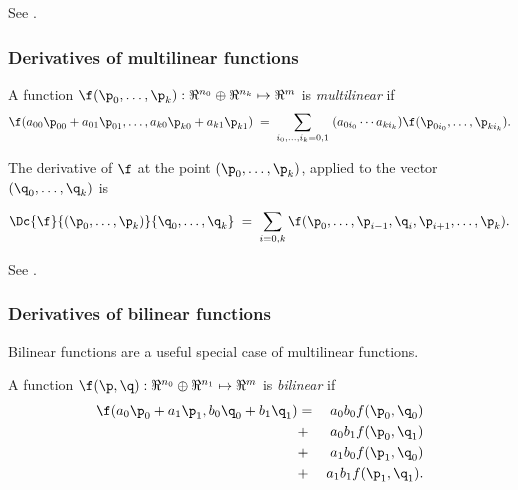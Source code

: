 See \cite[Theorem~2-2]{Spivak:1965:CalculusOnManifolds}.



\subsubsection{Derivatives of multilinear functions}
\label{sec:multilinear}

A function $\f(\p_0,\ldots,\p_k):\Re^{n_0} \oplus \Re^{n_k} \mapsto \Re^m$
is {\it multilinear} if
\begin{equation}
\f(a_{00} \p_{00} + a_{01} \p_{01}, \ldots, a_{k0} \p_{k0} + a_{k1} \p_{k1})
\; = \; \sum_{i_0,\ldots,i_k = 0,1} \;(a_{0i_0} \cdots a_{ki_k}) \f(\p_{0i_0}, \ldots, \p_{ki_k}).
\end{equation}

The derivative of $\f$
at the point $(\p_0,\ldots,\p_k)$, applied to the vector $(\q_0,\ldots,\q_k)$ is

\begin{equation}
\Dc{\f}{(\p_0,\ldots,\p_k)}{\q_0,\ldots,\q_k}
\; = \; \sum_{i=0,k} \f(\p_0,\ldots,\p_{i-1},\q_i,\p_{i+1},\ldots,\p_k).
\end{equation}

See \cite[ex.~2-14]{Spivak:1965:CalculusOnManifolds}.



\subsubsection{Derivatives of bilinear functions}
\label{sec:bilinear}

Bilinear functions are a useful special case of multilinear functions.

A function $\f(\p,\q):\Re^{n_0} \oplus \Re^{n_1} \mapsto \Re^m$
is {\it bilinear} if
\begin{eqnarray}
\f(a_0 \p_0 + a_1 \p_1, b_0 \q_0 + b_1 \q_1) & = & a_0 b_0 f(\p_0,\q_0)  \\
                                             & + & a_0 b_1 f(\p_0,\q_1) \nonumber \\
                                             & + & a_1 b_0 f(\p_1,\q_0) \nonumber \\
                                             & + & a_1 b_1 f(\p_1,\q_1).\nonumber
\end{eqnarray}

